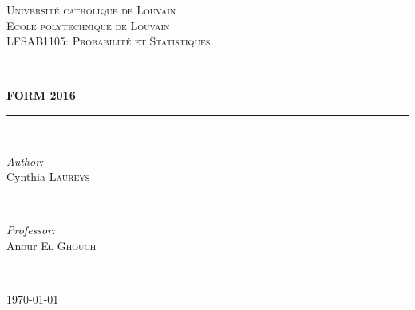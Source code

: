 \documentclass[paper=a4,fontsize=8pt,pagesize,DIV=calc]{scrartcl}
\begin{document}
\begin{titlepage}
\center

\newcommand{\HRule}{\rule{\linewidth}{0.5mm}}
 

\textsc{\Huge Université catholique de Louvain}\\[1.5cm]
\textsc{\Huge Ecole polytechnique de Louvain}\\[0.5cm]
\textsc{\Large LFSAB1105: Probabilité et Statistiques}\\[5cm]


\HRule \\[0.4cm]
{ \huge \bfseries FORM 2016}\\[0.4cm]
\HRule \\[1.5cm]
 

\begin{minipage}{0.4\textwidth}
\begin{flushleft} \large
\emph{Author:}\\
Cynthia \textsc{Laureys}
\end{flushleft}
\end{minipage}
~
\begin{minipage}{0.4\textwidth}
\begin{flushright} \large
\emph{Professor:} \\
Anour \textsc{El Ghouch}
\end{flushright}
\end{minipage}\\[5cm]


\vfill

{\large \today}\\[3cm]

\end{titlepage}
\end{document}
